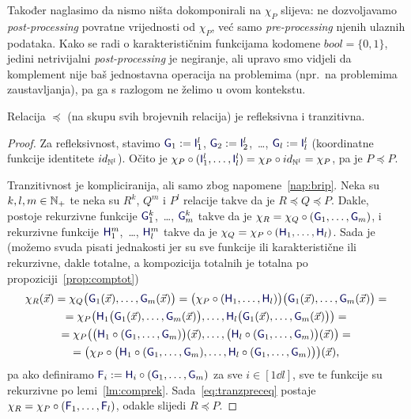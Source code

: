 Također naglasimo da nismo ništa dokomponirali na $\chi_P$ slijeva: ne dozvoljavamo \emph{post-processing} povratne vrijednosti od $\chi_P$, već samo \emph{pre-processing} njenih ulaznih podataka. Kako se radi o karakterističnim funkcijama kodomene $bool=\{0,1\}$, jedini netrivijalni \emph{post-processing} je negiranje, ali upravo smo vidjeli da komplement nije baš jednostavna operacija na problemima (npr.\ na %
problemima zaustavljanja), pa ga s razlogom ne želimo u ovom kontekstu.

\begin{propozicija}[{name=[refleksivnost i tranzitivnost svedivosti]}]\label{pp:preceqrt}
Relacija $\preceq$ (na skupu %
	svih brojevnih relacija) je refleksivna i tranzitivna.
\end{propozicija}
\begin{proof}
	Za refleksivnost, stavimo $\f G_1:=\f I_1^l$, $\f G_2:=\f I_2^l$,~\ldots, $\f G_l:=\f I_l^l$ (koordinatne funkcije identitete $id_{{\mathbb N}^l}$). Očito je $\chi_P\circ(\f I_1^l,\dotsc,\f I_l^l)=\chi_P\circ id_{\N^l}=\chi_P$, pa je $P\preceq P$.

	Tranzitivnost je kompliciranija, ali samo zbog napomene~\ref{nap:brip}. Neka su $k,l,m\in{\mathbb N}_+$ te neka su $R^k$, $Q^m$ i $P^l$ relacije takve da je $R\preceq Q\preceq P$. Dakle, postoje rekurzivne funkcije $\f G_1^k$,~\ldots, $\f G_m^k$ takve da je $\chi_R=\chi_Q\circ(\f G_1,\dotsc,\f G_m)$, i rekurzivne funkcije $\f H_1^m$,~\ldots, $\f H_l^m$ takve da je $\chi_Q=\chi_P\circ(\f H_1,\dotsc,\f H_l)$. Sada je (možemo svuda pisati jednakosti jer su sve funkcije ili karakteristične ili rekurzivne, dakle totalne, a kompozicija totalnih je totalna po propoziciji~\ref{prop:comptot})
\begin{multline}\label{eq:tranzpreceq}
    \chi_R(\vec x)=\chi_Q\bigl(\f G_1(\vec x),\dotsc,\f G_m(\vec x)\bigr)=\bigl(\chi_P\circ(\f H_1,\dotsc,\f H_l)\bigr)\bigl(\f G_1(\vec x),\dotsc,\f G_m(\vec x)\bigr)=\\
    =\chi_P\bigl(
    \f H_1\bigl(\f G_1(\vec x),\dotsc,\f G_m(\vec x)\bigr),\dotsc,
    \f H_l\bigl(\f G_1(\vec x),\dotsc,\f G_m(\vec x)\bigr)
    \bigr)=\\
    =\chi_P\bigl(
    \bigl(\f H_1\circ(\f G_1,\dotsc,\f G_m)\bigr)(\vec x),\dotsc,
    \bigl(\f H_l\circ(\f G_1,\dotsc,\f G_m)\bigr)(\vec x)\bigr)=\\
    =\bigl(\chi_P\circ\bigl(\f H_1\circ(\f G_1,\dotsc,\f G_m),\dotsc,\f H_l\circ(\f G_1,\dotsc,\f G_m)\bigr)\bigr)(\vec x)\text,
\end{multline}
pa ako definiramo $\f F_i:=\f H_i\circ(\f G_1,\dotsc,\f G_m)$ za sve $i\in[1\dd l]$, sve te funkcije su rekurzivne po lemi~\ref{lm:comprek}. Sada~\eqref{eq:tranzpreceq} postaje $\chi_R=\chi_P\circ(\f F_1,\dotsc,\f F_l)$, odakle slijedi $R\preceq P$.
\end{proof}

